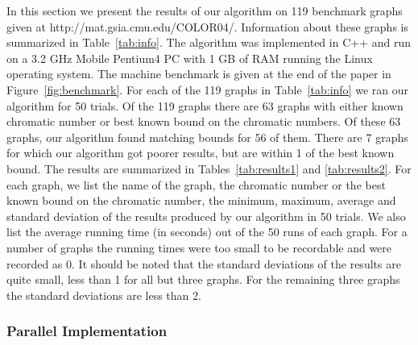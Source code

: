 \documentclass[11pt]{article}
\begin{document}
In this section we present the results of our algorithm on 119 benchmark
graphs given at http://mat.gsia.cmu.edu/COLOR04/.  Information about these
graphs is summarized in Table~\ref{tab:info}.  The algorithm was implemented
in C++ and run on a 3.2 GHz Mobile Pentium4 PC with 1 GB of RAM running the
Linux operating system.  The machine benchmark is given at the end of the
paper in Figure~\ref{fig:benchmark}.  For each of the 119 graphs in
Table~\ref{tab:info} we ran our algorithm for 50 trials.  Of the 119 graphs
there are 63 graphs with either known chromatic number or best known bound on
the chromatic numbers.  Of these 63 graphs, our algorithm found matching
bounds for 56 of them. There are 7 graphs for which our algorithm got poorer
results, but are within 1 of the best known bound.  The results are summarized
in Tables~\ref{tab:results1} and \ref{tab:results2}.  For each graph, we list
the name of the graph, the chromatic number or the best known bound on the
chromatic number, the minimum, maximum, average and standard deviation of the
results produced by our algorithm in 50 trials.  We also list the average
running time (in seconds) out of the 50 runs of each graph.  For a number of
graphs the running times were too small to be recordable and were recorded as
0.  It should be noted that the standard deviations of the results are quite
small, less than 1 for all but three graphs.  For the remaining three graphs
the standard deviations are less than 2.
\subsubsection{Parallel Implementation}
\end{document}
